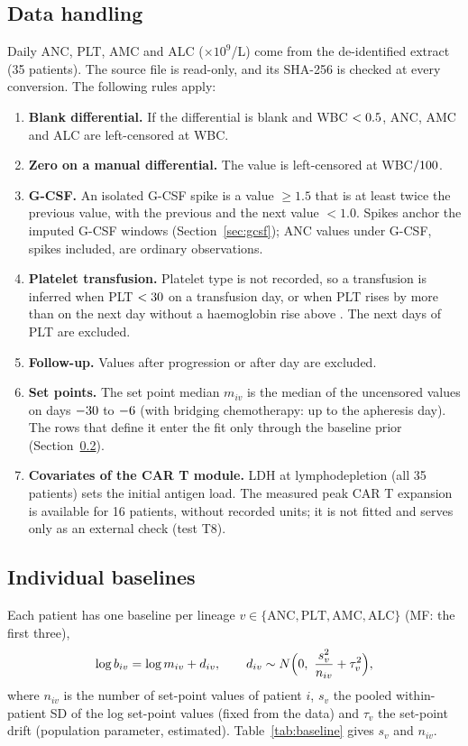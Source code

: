 \documentclass[11pt]{article}
\begin{document}
\subsection{Data handling}
Daily ANC, PLT, AMC and ALC ($\times10^9$/L) come from the de-identified extract (35 patients). The source file is read-only, and its SHA-256 is checked at every conversion. The following rules apply:
\begin{enumerate}
\item \textbf{Blank differential.} If the differential is blank and WBC $<0.5$, ANC, AMC and ALC are left-censored at WBC.
\item \textbf{Zero on a manual differential.} The value is left-censored at WBC$/100$.
\item \textbf{G-CSF.} An isolated G-CSF spike is a value $\geq1.5$ that is at least twice the previous value, with the previous and the next value $<1.0$. Spikes anchor the imputed G-CSF windows (Section~\ref{sec:gcsf}); ANC values under G-CSF, spikes included, are ordinary observations.
\item \textbf{Platelet transfusion.} Platelet type is not recorded, so a transfusion is inferred when PLT $<30$ on a transfusion day, or when PLT rises by more than \valPltRise{} on the next day without a haemoglobin rise above \valHgbRise. The next \valPltDrop{} days of PLT are excluded.
\item \textbf{Follow-up.} Values after progression or after day \valObsMax{} are excluded.
\item \textbf{Set points.} The set point median $m_{iv}$ is the median of the uncensored values on days $-30$ to $-6$ (with bridging chemotherapy: up to the apheresis day). The rows that define it enter the fit only through the baseline prior (Section~\ref{sec:baseline}).
\item \textbf{Covariates of the CAR T module.} LDH at lymphodepletion (all 35 patients) sets the initial antigen load. The measured peak CAR T expansion is available for 16 patients, without recorded units; it is not fitted and serves only as an external check (test T8).
\end{enumerate}

\subsection{Individual baselines}\label{sec:baseline}
Each patient has one baseline per lineage $v\in\{\mathrm{ANC},\mathrm{PLT},\mathrm{AMC},\mathrm{ALC}\}$ (MF: the first three),
\begin{equation}
\log b_{iv} = \log m_{iv} + d_{iv},\qquad d_{iv}\sim N\Bigl(0,\ \frac{s_v^2}{n_{iv}}+\tau_v^2\Bigr), \label{eq:baseprior}
\end{equation}
where $n_{iv}$ is the number of set-point values of patient $i$, $s_v$ the pooled within-patient SD of the log set-point values (fixed from the data) and $\tau_v$ the set-point drift (population parameter, estimated). Table~\ref{tab:baseline} gives $s_v$ and $n_{iv}$.
\end{document}
